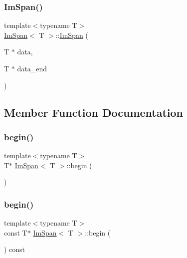 \mbox{\label{structImSpan_abc89fdbfad2b87dd044a197983c4eddb}} 
\subsubsection{\texorpdfstring{Im\+Span()}{ImSpan()}\hspace{0.1cm}{\footnotesize\ttfamily [3/3]}}
{\footnotesize\ttfamily template$<$typename T$>$ \\
\hyperlink{structImSpan}{Im\+Span}$<$ T $>$\+::\hyperlink{structImSpan}{Im\+Span} (\begin{DoxyParamCaption}\item[{T $\ast$}]{data,  }\item[{T $\ast$}]{data\+\_\+end }\end{DoxyParamCaption})\hspace{0.3cm}{\ttfamily [inline]}}



\subsection{Member Function Documentation}
\mbox{\label{structImSpan_a4f3db65183b094582006ba5439224358}} 
\subsubsection{\texorpdfstring{begin()}{begin()}\hspace{0.1cm}{\footnotesize\ttfamily [1/2]}}
{\footnotesize\ttfamily template$<$typename T$>$ \\
T$\ast$ \hyperlink{structImSpan}{Im\+Span}$<$ T $>$\+::begin (\begin{DoxyParamCaption}{ }\end{DoxyParamCaption})\hspace{0.3cm}{\ttfamily [inline]}}

\mbox{\label{structImSpan_abb2e6461d94d0d73b7a6c458b2c1957e}} 
\subsubsection{\texorpdfstring{begin()}{begin()}\hspace{0.1cm}{\footnotesize\ttfamily [2/2]}}
{\footnotesize\ttfamily template$<$typename T$>$ \\
const T$\ast$ \hyperlink{structImSpan}{Im\+Span}$<$ T $>$\+::begin (\begin{DoxyParamCaption}{ }\end{DoxyParamCaption}) const\hspace{0.3cm}{\ttfamily [inline]}}

